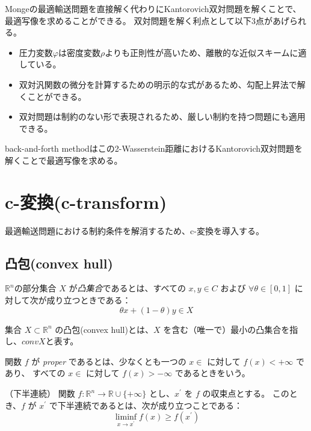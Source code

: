 Mongeの最適輸送問題を直接解く代わりにKantorovich双対問題を解くことで、最適写像を求めることができる。
双対問題を解く利点として以下3点があげられる。
\begin{itemize}
    \item 圧力変数$\varphi$は密度変数$\rho$よりも正則性が高いため、離散的な近似スキームに適している。
    \item 双対汎関数の微分を計算するための明示的な式があるため、勾配上昇法で解くことができる。
    \item 双対問題は制約のない形で表現されるため、厳しい制約を持つ問題にも適用できる。    
\end{itemize}

back-and-forth methodはこの2-Wasserstein距離におけるKantorovich双対問題を解くことで最適写像を求める。

\section{c-変換(c-transform)}
\label{sect:c-変換(c-transform)}
最適輸送問題における制約条件を解消するため、c-変換を導入する。
\subsection{凸包(convex hull)}
\label{sect:凸包(convex hull)}
\begin{dfn}[凸集合]
    $\mathbb{R}^n$の部分集合 $X$ が\textit{凸集合}であるとは、すべての $x, y \in C$ および $\forall \theta \in [0, 1]$ に対して次が成り立つときである：
    \[
        \theta x + (1 - \theta )y \in X
    \]
\end{dfn}

\begin{dfn}
    集合 $X \subset \mathbb{R}^n$ の凸包(convex hull)とは、$X$ を含む（唯一で）最小の凸集合を指し、$conv X$と表す。

\end{dfn}

\begin{dfn}
    関数 $f$ が \textit{proper} であるとは、少なくとも一つの $x \in $ に対して $f(x) < +\infty$ であり、
    すべての $x \in $ に対して $f(x) > - \infty$ であるときをいう。
\end{dfn}

\begin{dfn}（下半連続）
    関数 $f: \mathbb{R}^n \to \mathbb{R} \cup \{+ \infty\}$ とし、$x^{\prime}$ を $f$ の収束点とする。
    このとき、$f$ が $x^{\prime}$ で下半連続であるとは、次が成り立つことである：
    \[
        \liminf_{x \to x^{\prime}} {f(x)} \ge f(x^{\prime})
    \]
\end{dfn}

